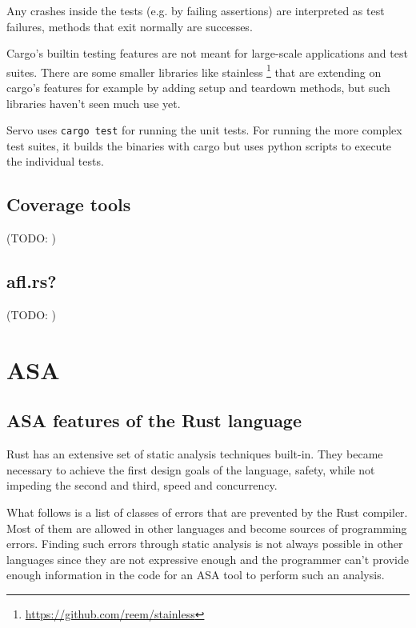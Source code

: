 \documentclass{scrartcl}
\newcommand{\todo}[1] {{\color{red}(TODO: #1)}}
\begin{document}
Any crashes inside the tests (e.g. by failing assertions) are interpreted as test failures, methods that exit normally are successes.

Cargo's builtin testing features are not meant for large-scale applications and test suites. There are some smaller libraries like stainless \footnote{\url{https://github.com/reem/stainless}} that are extending on cargo's features for example by adding setup and teardown methods, but such libraries haven't seen much use yet. 

Servo uses \texttt{cargo test} for running the unit tests. For running the more complex test suites, it builds the binaries with cargo but uses python scripts to execute the individual tests.


\subsection{Coverage tools}
\todo{}

\subsection{afl.rs?}
\todo{}





\section{ASA}



\subsection{ASA features of the Rust language} \label{rust_features}

Rust has an extensive set of static analysis techniques built-in. They became necessary to achieve the first design goals of the language, safety, while not impeding the second and third, speed and concurrency.

What follows is a list of classes of errors that are prevented by the Rust compiler. Most of them are allowed in other languages and become sources of programming errors. Finding such errors through static analysis is not always possible in other languages since they are not expressive enough and the programmer can't provide enough information in the code for an ASA tool to perform such an analysis.
\end{document}
